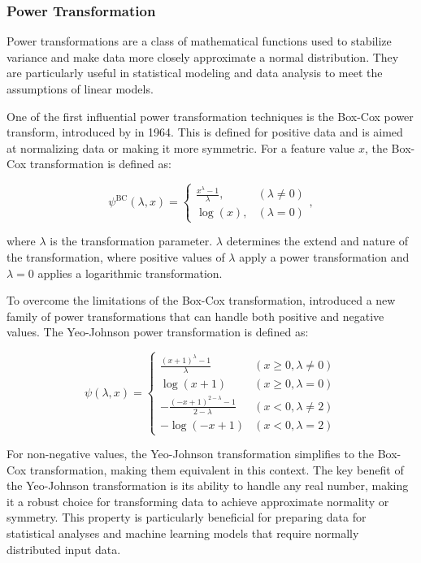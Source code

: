 \subsubsection{Power Transformation}
Power transformations are a class of mathematical functions used to stabilize variance and make data more closely approximate a normal distribution.
They are particularly useful in statistical modeling and data analysis to meet the assumptions of linear models.

One of the first influential power transformation techniques is the Box-Cox power transform, introduced by \citet{BoxAndCox} in 1964.
This is defined for positive data and is aimed at normalizing data or making it more symmetric.
For a feature value $x$, the Box-Cox transformation is defined as:

$$
\psi^{\text{BC}}(\lambda, x) =
\begin{cases}
\frac{x^\lambda - 1}{\lambda}, & (\lambda \neq 0) \\
\log(x), & (\lambda = 0)
\end{cases},
$$

where $\lambda$ is the transformation parameter.
$\lambda$ determines the extend and nature of the transformation, where positive values of $\lambda$ apply a power transformation and $\lambda = 0$ applies a logarithmic transformation.

To overcome the limitations of the Box-Cox transformation, \citet{YeoJohnson} introduced a new family of power transformations that can handle both positive and negative values.
The Yeo-Johnson power transformation is defined as:

$$
\psi(\lambda, x) =
\begin{cases}
\frac{(x + 1)^\lambda - 1}{\lambda} & (x \geq 0, \lambda \neq 0) \\
\log(x + 1) & (x \geq 0, \lambda = 0) \\
- \frac{(-x + 1)^{2 - \lambda} - 1}{2 - \lambda} & (x < 0, \lambda \neq 2) \\
-\log(-x + 1) & (x < 0, \lambda = 2)
\end{cases}
$$

For non-negative values, the Yeo-Johnson transformation simplifies to the Box-Cox transformation, making them equivalent in this context.
The key benefit of the Yeo-Johnson transformation is its ability to handle any real number, making it a robust choice for transforming data to achieve approximate normality or symmetry.
This property is particularly beneficial for preparing data for statistical analyses and machine learning models that require normally distributed input data.